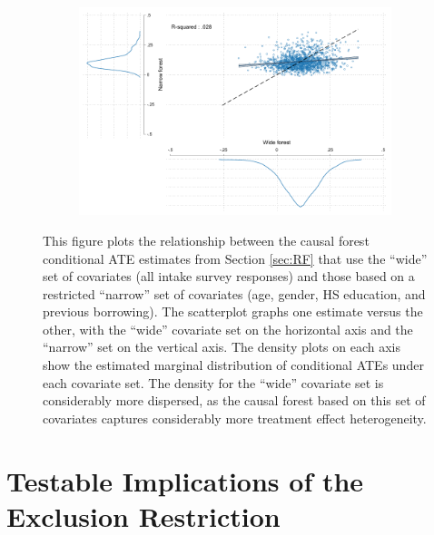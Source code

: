 \begin{appendix}
\begin{figure}[h!]
   \caption{Conditional ATEs from ``wide'' and ``narrow'' covariate sets.}
    \begin{center}
    \begin{subfigure}{0.75\textwidth}
        \centering
        \includegraphics[width=\textwidth]{Figuras/scatter_hist_wide_narrow.pdf}
    \end{subfigure}
    \end{center}
        \footnotesize{This figure plots the relationship between the causal forest conditional ATE estimates from Section \ref{sec:RF} that use the ``wide'' set of covariates (all intake survey responses) and those based on a restricted ``narrow'' set of covariates (age, gender, HS education, and previous borrowing). The scatterplot graphs one estimate versus the other, with the ``wide'' covariate set on the horizontal axis and the ``narrow'' set on the vertical axis. The density plots on each axis show the estimated marginal distribution of conditional ATEs under each covariate set. The density for the ``wide'' covariate set is considerably more dispersed, as the causal forest based on this set of covariates captures considerably more treatment effect heterogeneity.}
    \label{wide_narrow_forests}

\end{figure}

\newpage 

\section{Testable Implications of the Exclusion Restriction} \label{sec:testing_exclusion}


\end{appendix}
